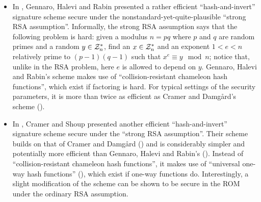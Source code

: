 \begin{itemize}
\item In \cite{gennaro:fastsigs}, Gennaro, Halevi and Rabin presented a rather
efficient ``hash-and-invert'' signature scheme secure under the
nonstandard-yet-quite-plausible ``strong RSA assumption''. Informally, the
strong RSA assumption says that the following problem is hard: given a modulus
$n = pq$ where $p$ and $q$ are random primes and a random $y \in \mathcal{Z}_n^*$,
find an $x \in \mathcal{Z}_n^*$ and an exponent $1 < e < n$ relatively prime to
$(p-1)(q-1)$ such that $x^e \equiv y \mod n$; notice that, unlike in the RSA
problem, here $e$ is allowed to depend on $y$. Gennaro, Halevi and Rabin's
scheme makes use of ``collision-resistant chameleon hash functions'', which
exist if factoring is hard. For typical settings of the security parameters,
it is more than twice as efficient as Cramer and Damg\aa rd's scheme
(\cite{cramer:fastsigs}). 

\item In \cite{cramer:signatures2}, Cramer and Shoup presented another
efficient ``hash-and-invert'' signature scheme secure under the ``strong RSA
assumption''. Their scheme builds on that of Cramer and Damg\aa rd
(\cite{cramer:fastsigs}) and is considerably simpler and potentially more
efficient than Gennaro, Halevi and Rabin's (\cite{gennaro:fastsigs}). Instead
of ``collision-resistant chameleon hash functions'', it makes use of
``universal one-way hash functions'' (\cite{naor:universal}), which exist if
one-way functions do.
Interestingly, a slight modification of the scheme can be shown to be secure
in the ROM under the ordinary RSA assumption.



\end{itemize}
